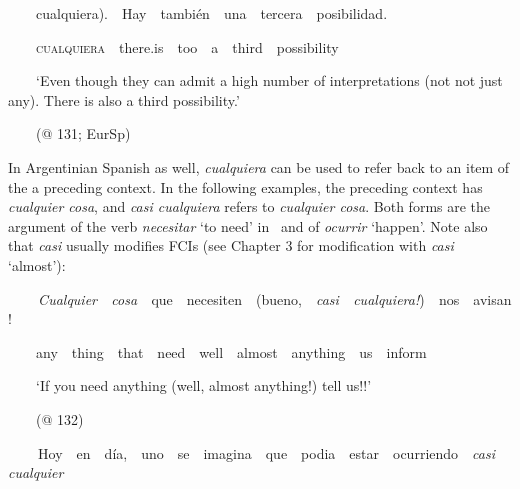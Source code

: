 \begin{styleStandard}
\ \ \ \ cualquiera).\ \ Hay\ \ también\ \ una\ \ tercera\ \ posibilidad.
\end{styleStandard}

\begin{styleStandard}
\ \ \ \ \textsc{cualquiera}\ \ there.is\ \ too\ \ a\ \ third\ \ possibility
\end{styleStandard}

\begin{styleStandard}
\ \ \ \ ‘Even though they can admit a high number of interpretations (not not just any). There is also a third possibility.’
\end{styleStandard}

\begin{styleStandard}
\ \ \ \ (@ 131; EurSp)
\end{styleStandard}

\begin{styleStandard}
In Argentinian Spanish as well, \textit{cualquiera} can be used to refer back to an item of the a preceding context. In the following examples, the preceding context has \textit{cualquier cosa}, and \textit{casi cualquiera} refers to \textit{cualquier cosa}. Both forms are the argument of the verb \textit{necesitar} ‘to need’ in \ and of \textit{ocurrir} ‘happen’. Note also that \textit{casi} usually modifies FCIs (see Chapter 3 for modification with \textit{casi} ‘almost’):
\end{styleStandard}

\begin{styleStandard}
\label{bkm:Ref150786782}\textbf{\ \ }\ \ \textit{Cualquier\ \ cosa\ \ }que\ \ necesiten\ \ (bueno,\ \ \textit{casi\ \ cualquiera!})\textit{\ \ }nos\ \ avisan!
\end{styleStandard}

\begin{styleStandard}
\ \ \ \ any\ \ thing\ \ that\ \ need\ \ well\ \ almost\ \ anything\ \ us\ \ inform
\end{styleStandard}

\begin{styleStandard}
\ \ \ \ ‘If you need anything (well, almost anything!) tell us!!’
\end{styleStandard}

\begin{styleStandard}
\ \ \ \ (@ 132)
\end{styleStandard}

\begin{styleStandard}
\label{bkm:Ref150786875}\textbf{\ \ }\ \ Hoy\ \ en\ \ día,\ \ uno\ \ se\ \ imagina\ \ que\ \ podia\ \ estar\ \ ocurriendo\ \ \textit{casi\ \ cualquier}
\end{styleStandard}


